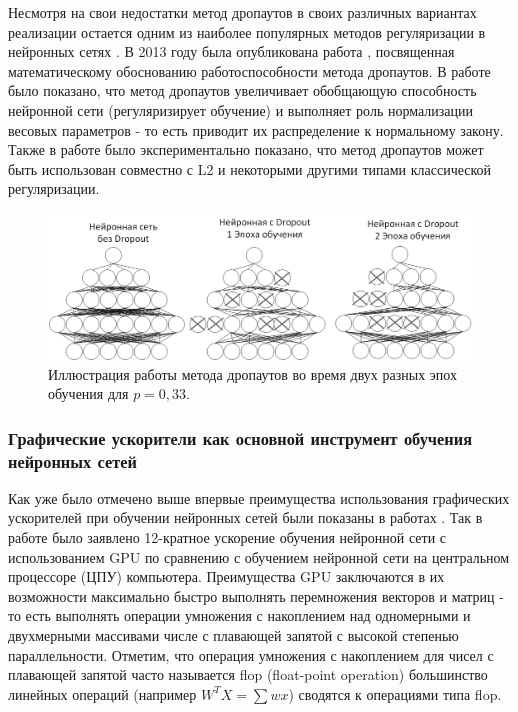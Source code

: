 \documentclass[12pt]{article}
\begin{document}
\begin{sloppypar}
Несмотря на свои недостатки метод дропаутов в своих различных вариантах реализации остается одним из наиболее популярных методов регуляризации в нейронных сетях \cite{moradi2020survey, labach2019survey}. В 2013 году была опубликована работа \cite{baldi2013understanding}, посвященная математическому обоснованию работоспособности метода дропаутов. В работе \cite{baldi2013understanding} было показано, что метод дропаутов увеличивает обобщающую способность нейронной сети (регуляризирует обучение) и выполняет роль нормализации весовых параметров - то есть приводит их распределение к нормальному закону. Также в работе \cite{srivastava2014dropout} было экспериментально показано, что метод дропаутов может быть использован совместно с L2 и некоторыми другими типами классической регуляризации.

\begin{figure}[h]
	\begin{center}
		\includegraphics[width=0.79\linewidth]{./figuresch1/dropout.png}
		\caption{Иллюстрация работы метода дропаутов во время двух разных эпох обучения для $p=0,33$.}	\label{ch1:fig:dropout}
	\end{center}
\end{figure}

\subsubsection{Графические ускорители как основной инструмент обучения нейронных сетей}
Как уже было отмечено выше впервые преимущества использования графических ускорителей при обучении нейронных сетей были показаны в работах \cite{oh2004gpu, steinkraus2005using, chellapilla2006high}. Так в работе \cite{oh2004gpu} было заявлено 12-кратное ускорение обучения нейронной сети с использованием GPU по сравнению с обучением нейронной сети на центральном процессоре (ЦПУ) компьютера. Преимущества GPU заключаются в их возможности максимально быстро  выполнять перемножения векторов и матриц - то есть выполнять операции умножения с накоплением над одномерными и двухмерными массивами числе с плавающей запятой с высокой степенью параллельности. Отметим, что операция умножения с накоплением для чисел с плавающей запятой часто называется flop (float-point operation) большинство линейных операций (например $W^TX = \sum wx$) сводятся к операциями типа flop.


\end{sloppypar}
\end{document}
